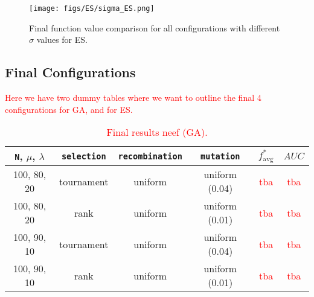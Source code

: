 \documentclass{article}
\newcommand{\todo}[1]{\textcolor{red}{#1}}
\begin{document}
\begin{figure*}[htbp]
    \centering
    \texttt{[image: figs/ES/sigma\_ES.png]}
    \captionsetup{width=.55\textwidth}
    \caption{
        Final function value comparison for all configurations with different $\sigma$ values for ES.
    }
    \label{fig:sigma_ES}
\end{figure*}

\newpage

\subsection*{Final Configurations}
\label{subsec:final_configs}

\todo{Here we have two dummy tables where we want to outline the final 4 configurations for GA, and for ES.}



\begin{table}[htbp]
    \centering
    \begin{tabular}{cccc|cc}
        \toprule
        \texttt{N}, $\mu$, $\lambda$ & \texttt{selection} & \texttt{recombination} & \texttt{mutation}
            & $f^*_{\mathrm{avg}} $ & $AUC$ \\ %
        \midrule
        100, 80, 20  &  tournament  &  uniform   &  uniform (0.04)  &  \todo{tba}  &  \todo{tba}  \\
        100, 80, 20  &  rank        &  uniform   &  uniform (0.01)  &  \todo{tba}  &  \todo{tba}  \\
        100, 90, 10  &  tournament  &  uniform   &  uniform (0.04)  &  \todo{tba}  &  \todo{tba}  \\
        100, 90, 10  &  rank        &  uniform   &  uniform (0.01)  &  \todo{tba}  &  \todo{tba}  \\
        \bottomrule
    \end{tabular}
    \vspace{0.1cm}
    \caption{\todo{Final results neef (GA).}}
    \label{tab:GA_final_configs}
\end{table}
\end{document}
